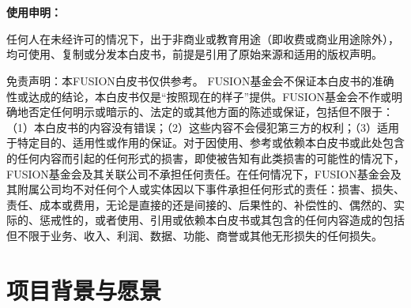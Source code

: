 \documentclass[a4paper,12pt]{article}
\begin{document}
\medskip
\noindent
 \\\\
\medskip
\noindent

\thispagestyle{empty}

\newpage
\thispagestyle{empty}

\noindent
\textbf{\large{使用申明：}}

\onehalfspacing

\onehalfspacing

任何人在未经许可的情况下，出于非商业或教育用途（即收费或商业用途除外），均可使用、复制或分发本白皮书，前提是引用了原始来源和适用的版权声明。

免责声明：本FUSION白皮书仅供参考。 FUSION基金会不保证本白皮书的准确性或达成的结论，本白皮书仅是“按照现在的样子”提供。FUSION基金会不作或明确地否定任何明示或暗示的、法定的或其他方面的陈述或保证，包括但不限于：（1）本白皮书的内容没有错误；（2）这些内容不会侵犯第三方的权利；（3）适用于特定目的、适用性或作用的保证。对于因使用、参考或依赖本白皮书或此处包含的任何内容而引起的任何形式的损害，即使被告知有此类损害的可能性的情况下，FUSION基金会及其关联公司不承担任何责任。在任何情况下，FUSION基金会及其附属公司均不对任何个人或实体因以下事件承担任何形式的责任：损害、损失、责任、成本或费用，无论是直接的还是间接的、后果性的、补偿性的、偶然的、实际的、惩戒性的，或者使用、引用或依赖本白皮书或其包含的任何内容造成的包括但不限于业务、收入、利润、数据、功能、商誉或其他无形损失的任何损失。
\newpage
\thispagestyle{empty}

\renewcommand{\contentsname}{\centerline{目\  录}}
\tableofcontents
\thispagestyle{empty}

\newpage

\clearpage

\onehalfspacing

\setcounter{footnote}{0}
\renewcommand{\thefootnote}{\arabic{footnote}}


\setcounter{page}{1}



\pagestyle{fancy}

\cfoot{}




\section{项目背景与愿景}
\end{document}
